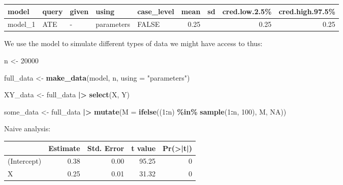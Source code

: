 \documentclass[
  12pt,
]{book}
\newenvironment{Shaded}{\begin{snugshade}}{\end{snugshade}}
\newcommand{\AttributeTok}[1]{\textcolor[rgb]{0.13,0.29,0.53}{#1}}
\newcommand{\ConstantTok}[1]{\textcolor[rgb]{0.56,0.35,0.01}{#1}}
\newcommand{\DecValTok}[1]{\textcolor[rgb]{0.00,0.00,0.81}{#1}}
\newcommand{\FunctionTok}[1]{\textcolor[rgb]{0.13,0.29,0.53}{\textbf{#1}}}
\newcommand{\NormalTok}[1]{#1}
\newcommand{\OtherTok}[1]{\textcolor[rgb]{0.56,0.35,0.01}{#1}}
\newcommand{\SpecialCharTok}[1]{\textcolor[rgb]{0.81,0.36,0.00}{\textbf{#1}}}
\newcommand{\StringTok}[1]{\textcolor[rgb]{0.31,0.60,0.02}{#1}}
\begin{document}
\begin{tabular}{l|l|l|l|l|r|r|r|r}
\hline
model & query & given & using & case\_level & mean & sd & cred.low.2.5\% & cred.high.97.5\%\\
\hline
model\_1 & ATE & - & parameters & FALSE & 0.25 &  & 0.25 & 0.25\\
\hline
\end{tabular}

We use the model to simulate different types of data we might have access to thus:

\begin{Shaded}
\begin{Highlighting}[]
\NormalTok{n }\OtherTok{\textless{}{-}} \DecValTok{20000}

\NormalTok{full\_data }\OtherTok{\textless{}{-}}  \FunctionTok{make\_data}\NormalTok{(model, n, }\AttributeTok{using =} \StringTok{"parameters"}\NormalTok{)}

\NormalTok{XY\_data }\OtherTok{\textless{}{-}}\NormalTok{ full\_data }\SpecialCharTok{|\textgreater{}} \FunctionTok{select}\NormalTok{(X, Y)}

\NormalTok{some\_data  }\OtherTok{\textless{}{-}}\NormalTok{ full\_data }\SpecialCharTok{|\textgreater{}}  \FunctionTok{mutate}\NormalTok{(}\AttributeTok{M =} \FunctionTok{ifelse}\NormalTok{((}\DecValTok{1}\SpecialCharTok{:}\NormalTok{n) }\SpecialCharTok{\%in\%} \FunctionTok{sample}\NormalTok{(}\DecValTok{1}\SpecialCharTok{:}\NormalTok{n, }\DecValTok{100}\NormalTok{), M, }\ConstantTok{NA}\NormalTok{))}
\end{Highlighting}
\end{Shaded}

Naive analysis:

\begin{Shaded}
\end{Shaded}

\begin{tabular}{l|r|r|r|r}
\hline
  & Estimate & Std. Error & t value & Pr(>|t|)\\
\hline
(Intercept) & 0.38 & 0.00 & 95.25 & 0\\
\hline
X & 0.25 & 0.01 & 31.32 & 0\\
\hline
\end{tabular}
\end{document}
